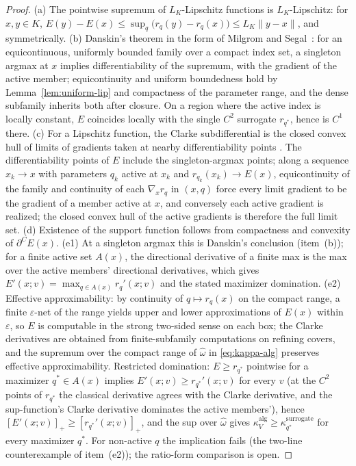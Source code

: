 \documentclass[11pt,a4paper]{article}
\theoremstyle{plain}
\theoremstyle{definition}
\theoremstyle{remark}
\newcommand{\kk}{\kappa_{\!V}}
\begin{document}
\begin{proof}
(a) The pointwise supremum of $L_K$-Lipschitz functions is
$L_K$-Lipschitz: for $x, y \in K$,
$E(y) - E(x) \le \sup_q\bigl(r_q(y) - r_q(x)\bigr) \le L_K\|y - x\|$,
and symmetrically. (b) Danskin's theorem in the form of Milgrom
and Segal~\citep{milgromsegal2002}: for an equicontinuous, uniformly
bounded family over a
compact index set, a singleton argmax at $x$ implies
differentiability of the supremum, with the gradient of the active
member; equicontinuity and uniform boundedness hold by
Lemma~\ref{lem:uniform-lip} and compactness of the parameter range,
and the dense subfamily inherits both after closure. On a region
where the active index is locally constant, $E$ coincides locally
with the single $C^2$ surrogate $r_{q^*}$, hence is $C^1$ there.
(c) For a Lipschitz function, the Clarke subdifferential is the
closed convex hull of limits of gradients taken at nearby
differentiability points \citep[Theorem~2.5.1]{clarke1990}. The
differentiability points of $E$ include the singleton-argmax points;
along a sequence $x_k \to x$ with parameters $q_k$ active at $x_k$
and $r_{q_k}(x_k) \to E(x)$, equicontinuity of the family and
continuity of each $\nabla_x r_q$ in $(x, q)$ force every limit
gradient to be the gradient of a member active at $x$, and
conversely each active gradient is realized; the closed convex hull
of the active gradients is therefore the full limit set. (d)
Existence of the support function follows from compactness and
convexity of $\partial^{C}E(x)$. (e1) At a singleton argmax this is Danskin's conclusion (item~(b));
for a finite active set $A(x)$, the directional derivative of a
finite max is the max over the active members'
directional derivatives, which gives $E'(x;v)=\max_{q\in A(x)}
r_q'(x;v)$ and the stated maximizer domination. (e2) Effective
approximability: by
continuity of $q \mapsto r_q(x)$ on the compact range, a finite
$\varepsilon$-net of the range yields upper and lower approximations
of $E(x)$ within $\varepsilon$, so $E$ is computable in the strong
two-sided sense on each box; the Clarke derivatives are obtained
from finite-subfamily computations on refining covers, and the
supremum over the compact range of $\hat\omega$ in
\eqref{eq:kappa-alg} preserves effective approximability.
Restricted domination: $E \ge r_{q^*}$ pointwise for a maximizer
$q^{*} \in A(x)$ implies $E'(x; v) \ge r_{q^*}'(x; v)$ for every
$v$ (at the $C^2$ points of $r_{q^*}$ the classical derivative
agrees with the Clarke derivative, and the sup-function's Clarke
derivative dominates the active members'), hence
$[E'(x; v)]_+ \geq [r_{q^*}'(x; v)]_+$, and the sup over
$\hat\omega$ gives
$\kk^{\mathrm{alg}} \geq \kappa^{\mathrm{surrogate}}_{q^*}$ for
every maximizer $q^{*}$. For non-active $q$ the implication fails
(the two-line counterexample of item~(e2)); the ratio-form
comparison is open.
\end{proof}
\end{document}
